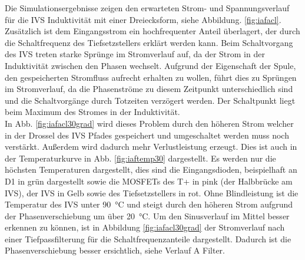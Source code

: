 		Die Simulationsergebnisse zeigen den erwarteten Strom- und Spannungsverlauf für die \gls{IVS} Induktivität mit einer Dreiecksform, siehe Abbildung. \ref{fig:iafacl}. Zusätzlich ist dem Eingangsstrom ein hochfrequenter Anteil überlagert, der durch die Schaltfrequenz des Tiefsetzstellers erklärt werden kann. Beim Schaltvorgang des \gls{IVS} treten starke Sprünge im Stromverlauf auf, da der Strom in der Induktivität zwischen den Phasen wechselt. Aufgrund der Eigenschaft der Spule, den gespeicherten Stromfluss aufrecht erhalten zu wollen, führt dies zu Sprüngen im Stromverlauf, da die Phasenströme zu diesem Zeitpunkt unterschiedlich sind und die Schaltvorgänge durch Totzeiten verzögert werden. Der Schaltpunkt liegt beim Maximum des Stromes in der Induktivität.\\
		In Abb. \ref{fig:iafacl30grad} wird dieses Problem durch den höheren Strom welcher in der Drossel des \gls{IVS} Pfades gespeichert und umgeschaltet werden muss noch verstärkt. Außerdem wird dadurch mehr Verlustleistung erzeugt. Dies ist auch in der Temperaturkurve in Abb. \ref{fig:iaftemp30} dargestellt. Es werden nur die höchsten Temperaturen dargestellt, dies sind die Eingangsdioden, beispielhaft an D1 in grün dargestellt sowie die \gls{MOSFET}s des T+ in pink (der Halbbrücke am \gls{IVS}), der \gls{IVS} in Gelb sowie des Tiefsetzstellers in rot. Ohne Blindleistung ist die Temperatur des IVS unter 90~°C und steigt durch den höheren Strom aufgrund der Phasenverschiebung um über 20~°C. Um den Sinusverlauf im Mittel besser erkennen zu können, ist in Abbildung \ref{fig:iafacl30grad} der Stromverlauf nach einer Tiefpassfilterung für die Schaltfrequenzanteile dargestellt. Dadurch ist die Phasenverschiebung besser ersichtlich, siehe Verlauf A Filter.
